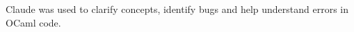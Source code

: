 







\begin{AIDcomment}
Claude was used to clarify concepts, identify bugs and help understand errors in OCaml code.
\end{AIDcomment}

